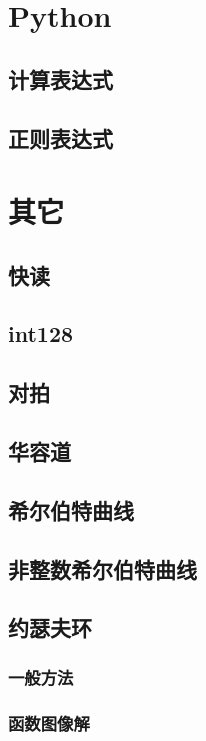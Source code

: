 \documentclass{article}
\begin{document}
\section{Python}
\subsection{﻿计算表达式}

\subsection{正则表达式}




\section{﻿其它}

\subsection{﻿快读}

\subsection{int128}

\subsection{对拍}

\subsection{华容道}

\subsection{希尔伯特曲线}
\begin{figure}[htb] 
 \end{figure}

\subsection{非整数希尔伯特曲线}

\subsection{约瑟夫环}
\subsubsection{一般方法}

\subsubsection{函数图像解}

\end{document}
